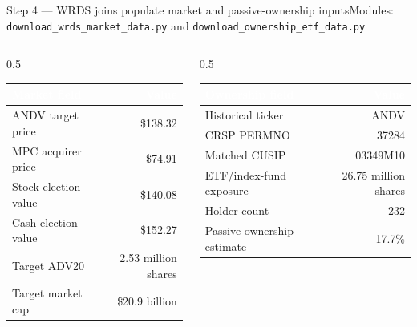 \documentclass[aspectratio=169,10pt]{beamer}
\newcommand{\hdr}[1]{\textcolor{white}{\normalfont\bfseries #1}}
\begin{document}
\begin{frame}{Step 4 --- WRDS joins populate market and passive-ownership inputs}{Modules: \texttt{download\_wrds\_market\_data.py} and \texttt{download\_ownership\_etf\_data.py}}
  \vspace{0.2cm}
  \begin{columns}[T]
    \begin{column}{0.5\textwidth}
      \begin{tabularx}{\linewidth}{@{}X r@{}}
        \rowcolor{navy}\hdr{Market field} & \hdr{Value}\\ \midrule
        ANDV target price & \$138.32\\
        MPC acquirer price & \$74.91\\
        Stock-election value & \$140.08\\
        Cash-election value & \$152.27\\
        Target ADV20 & 2.53 million shares\\
        Target market cap & \$20.9 billion\\
      \end{tabularx}
    \end{column}
    \begin{column}{0.5\textwidth}
      \begin{tabularx}{\linewidth}{@{}X r@{}}
        \rowcolor{navy}\hdr{Ownership field} & \hdr{Value}\\ \midrule
        Historical ticker & ANDV\\
        CRSP PERMNO & 37284\\
        Matched CUSIP & 03349M10\\
        ETF/index-fund exposure & 26.75 million shares\\
        Holder count & 232\\
        Passive ownership estimate & 17.7\%\\
      \end{tabularx}
    \end{column}
  \end{columns}
\end{frame}
\end{document}
